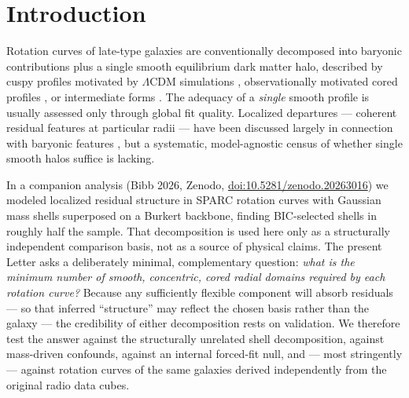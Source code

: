 \documentclass[twocolumn]{aastex701}
\providecommand{\doi}[1]{\href{https://doi.org/#1}{doi:#1}}
\begin{document}

\section{Introduction} \label{sec:intro}

Rotation curves of late-type galaxies are conventionally decomposed into
baryonic contributions plus a single smooth equilibrium dark matter halo,
described by cuspy profiles motivated by $\Lambda$CDM simulations
\citep[NFW;][]{Navarro1996}, observationally motivated cored profiles
\citep[Burkert;][]{Burkert1995}, or intermediate forms
\citep[Einasto;][]{Einasto1965}. The adequacy of a \emph{single} smooth
profile is usually assessed only through global fit quality. Localized
departures --- coherent residual features at particular radii --- have been
discussed largely in connection with baryonic features
\citep[``Renzo's rule'';][]{Sancisi2004}, but a systematic, model-agnostic
census of whether single smooth halos suffice is lacking.

In a companion analysis (Bibb 2026, Zenodo, \doi{10.5281/zenodo.20263016}) we
modeled localized residual structure in SPARC \citep{Lelli2016} rotation
curves with Gaussian mass shells superposed on a Burkert backbone, finding
BIC-selected shells in roughly half the sample. That decomposition is used
here only as a structurally independent comparison basis, not as a source of
physical claims. The present Letter asks a deliberately minimal,
complementary question: \emph{what is the minimum number of smooth,
concentric, cored radial domains required by each rotation curve?} Because
any sufficiently flexible component will absorb residuals --- so that
inferred ``structure'' may reflect the chosen basis rather than the galaxy
--- the credibility of either decomposition rests on validation. We therefore
test the answer against the structurally unrelated shell decomposition,
against mass-driven confounds, against an internal forced-fit null, and ---
most stringently --- against rotation curves of the same galaxies derived
independently from the original radio data cubes.
\end{document}
